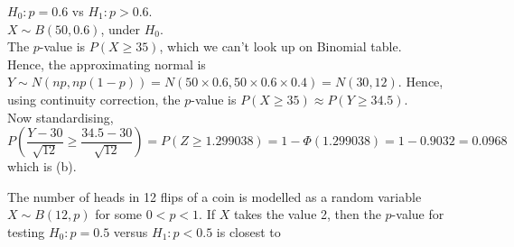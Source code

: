 \documentclass[bigtut]{tutorial}
\begin{document}
\begin{tutorial}
\begin{questions}

\begin{solution}
 $H_0: p=0.6$ vs $H_1: p > 0.6$. \\

 $X \sim B(50,0.6)$, under $H_0$. \\

The $p$-value is $P(X \geq 35)$, which we can't look up on Binomial table. \\

Hence, the approximating normal is $Y \sim N(np,np(1-p)) = N(50 \times 0.6, 50 \times 0.6 \times 0.4) = N(30,12)$.
Hence, using continuity correction, the $p$-value is  $P(X \geq 35)  \approx P(Y \geq 34.5)$. \\
Now standardising, \\
\[ P( \frac{Y-30}{\sqrt{12}} \geq  \frac{34.5-30}{\sqrt{12}}) = P(Z \geq 1.299038) = 1- \Phi(1.299038) = 1- 0.9032 =  0.0968 \]
which is (b).
\end{solution}


\question
The number of heads in 12 flips of a coin is modelled as a random variable $X \sim B(12,p)$ for some $0 < p < 1$. If $X$ takes the value 2, then the $p$-value for testing $H_0 : p = 0.5$ versus $H_1 : p < 0.5$ is closest to
\end{questions}
\end{tutorial}
\end{document}
